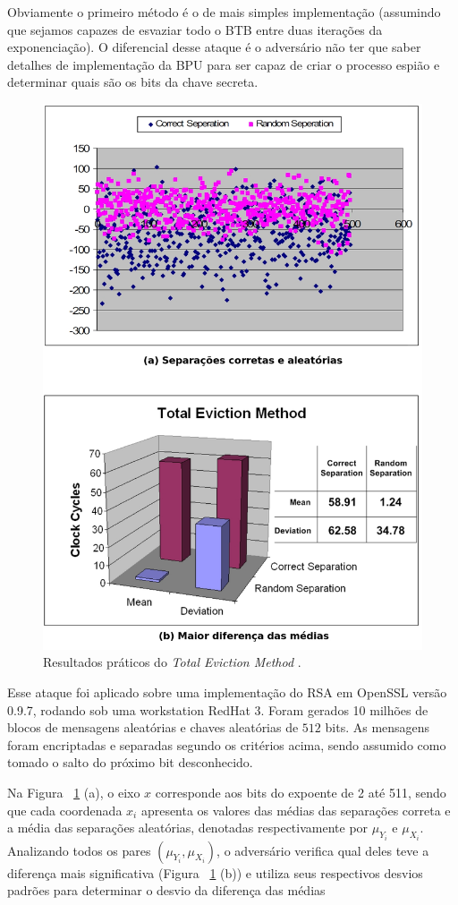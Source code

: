 Obviamente o primeiro m\'{e}todo \'{e} o de mais simples implementa\c{c}\~{a}o (assumindo que sejamos capazes de esvaziar todo o BTB entre duas itera\c{c}\~{o}es da exponencia\c{c}\~{a}o). O diferencial desse ataque \'{e} o advers\'{a}rio n\~{a}o ter que saber detalhes de implementa\c{c}\~{a}o da BPU para ser capaz de criar o processo espi\~{a}o e determinar quais s\~{a}o os bits da chave secreta.

\begin{figure}[ht]
	\centering
	\includegraphics[width=.7\textwidth]{figures/totaleviction.jpg}
	\caption{Resultados pr\'{a}ticos do \textit{Total Eviction Method} \cite{Jean-Pierre06predictingsecret}.}
	\label{fig:Fig_totaleviction}
\end{figure}

Esse ataque foi aplicado sobre uma implementa\c{c}\~{a}o do RSA em OpenSSL vers\~{a}o 0.9.7, rodando sob uma workstation RedHat 3. Foram gerados 10 milh\~{o}es de blocos de mensagens aleat\'{o}rias e chaves aleat\'{o}rias de $512$ bits. As mensagens foram encriptadas e separadas segundo os crit\'{e}rios acima, sendo assumido como tomado o salto do pr\'{o}ximo bit desconhecido.
       
Na Figura ~\ref{fig:Fig_totaleviction} (a), o eixo $x$ corresponde aos bits do expoente de 2 at\'{e} 511, sendo que cada coordenada $x_{i}$ apresenta os valores das m\'{e}dias das separa\c{c}\~{o}es correta e a m\'{e}dia das separa\c{c}\~{o}es aleat\'{o}rias, denotadas respectivamente por $\mu_{Y_{i}}$ e $\mu_{X_{i}}$. Analizando todos os pares $(\mu_{Y_{i}}, \mu_{X_{i}})$, o advers\'{a}rio verifica  qual deles teve a diferen\c{c}a mais significativa (Figura ~\ref{fig:Fig_totaleviction} (b)) e utiliza seus respectivos desvios padr\~{o}es para determinar o desvio da diferen\c{c}a das m\'{e}dias

